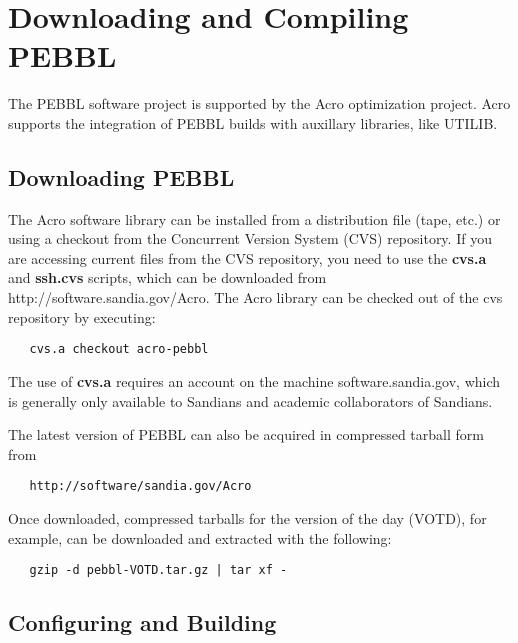 \section{Downloading and Compiling PEBBL}


The PEBBL software project is supported by the Acro optimization
project.  Acro supports the integration of PEBBL builds with auxillary
libraries, like UTILIB.


\subsection{Downloading PEBBL}

The Acro software library can be installed from a distribution file
(tape, etc.) or using a checkout from the Concurrent Version System (CVS)
repository. If you are accessing current files from the CVS repository,
you need to use the {\bf cvs.a} and {\bf ssh.cvs} scripts, which can be
downloaded from http://software.sandia.gov/Acro.  The Acro library can
be checked out of the cvs repository by executing:
\begin{verbatim}
   cvs.a checkout acro-pebbl
\end{verbatim}
The use of {\bf cvs.a} requires an account on the machine software.sandia.gov,
which is generally only available to Sandians and academic collaborators
of Sandians.

The latest version of PEBBL can also be acquired in compressed tarball
form from 
\begin{verbatim}
   http://software/sandia.gov/Acro
\end{verbatim}
Once downloaded, compressed tarballs
for the version of the day (VOTD), for example, 
can be downloaded and extracted with the 
following:
\begin{verbatim}
   gzip -d pebbl-VOTD.tar.gz | tar xf -
\end{verbatim}


\subsection{Configuring and Building}

